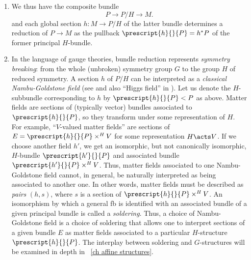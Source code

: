 \begin{rem}
    \begin{enumerate}
        \item We thus have the composite bundle 
        \[P\to P\slash H\to M.\]
        and each global section $h:M\to P\slash H$ of the latter bundle determines a reduction of $P\to M$ as the pullback $\prescript{h}{}{P}=h^\ast P$ of the former principal $H$-bundle.
        \item In the language of gauge theories, bundle reduction represents \emph{symmetry breaking}: from the whole (unbroken) symmetry group $G$ to the group $H$ of reduced symmetry. A section $h$ of $P\slash H$ can be interpreted as a \emph{classical Nambu-Goldstone field} (see \cite{Radosevic} and also ``Higgs field'' in \cite{Giachetta}). Let us denote the $H$-subbundle corresponding to $h$ by $\prescript{h}{}{P}<P$ as above. Matter fields are sections of (typically vector) bundles associated to $\prescript{h}{}{P}$, so they transform under some representation of $H$. For example, ``$V$-valued matter fields'' are sections of $E=\prescript{h}{}{P}\times^H V$ for some representation $H\acts V$. If we choose another field $h'$, we get an isomorphic, but not canonically isomorphic, $H$-bundle $\prescript{h'}{}{P}$ and associated bundle $\prescript{h'}{}{P}\times^H V$. Thus, matter fields associated to one Nambu-Goldstone field cannot, in general, be naturally interpreted as being associated to another one. In other words, matter fields must be described as \emph{pairs} $(h,s)$, where $s$ is a section of $\prescript{h}{}{P}\times^H V$. An isomorphism by which a general \gls{fb} is identified with an associated bundle of a given principal bundle is called a \emph{soldering}. Thus, a choice of Nambu-Goldstone field is a choice of soldering that allows one to interpret sections of a given bundle $E$ as matter fields associated to a particular $H$-structure $\prescript{h}{}{P}$. The interplay between soldering and $G$-structures will be examined in depth in \Chap~\ref{ch affine structures}.
    \end{enumerate}
\end{rem}

